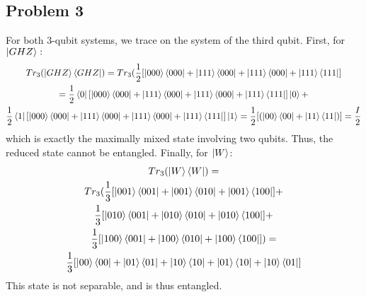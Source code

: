 \documentclass[12pt]{article}%
\begin{document}
 \subsection*{Problem 3}
  For both 3-qubit systems, we trace on the system of the third qubit. First, for $\ket{GHZ}:$
  \begin{gather*}
    Tr_3(\ket{GHZ}\bra{GHZ}) = Tr_3(\frac{1}{2}[\ket{000}\bra{000} + \ket{111}\bra{000} + \ket{111}\bra{000} + \ket{111}\bra{111}] \\
    =  \frac{1}{2} \bra{0}[\ket{000}\bra{000} + \ket{111}\bra{000} + \ket{111}\bra{000} + \ket{111}\bra{111}]\ket{0} + \\ \frac{1}{2}\bra{1}[\ket{000}\bra{000} + \ket{111}\bra{000} + \ket{111}\bra{000} + \ket{111}\bra{111}]\ket{1}
    = \frac{1}{2}[(\ket{00}\bra{00} + \ket{11}\bra{11})] = \frac{I}{2}
  \end{gather*}
  which is exactly the maximally mixed state involving two qubits. Thus, the reduced state cannot be entangled.
  Finally, for $\ket{W}$:
  \begin{gather*}
    Tr_3(\ket{W}\bra{W}) = \\
    Tr_3(\frac{1}{3}[\ket{001}\bra{001} + \ket{001}\bra{010} + \ket{001}\bra{100}] + \\
    \frac{1}{3} [\ket{010}\bra{001} + \ket{010}\bra{010} + \ket{010}\bra{100}] + \\
    \frac{1}{3} [\ket{100}\bra{001} + \ket{100}\bra{010} + \ket{100}\bra{100}]) = \\
    \frac{1}{3}[\ket{00}\bra{00} + \ket{01}\bra{01} + \ket{10}\bra{10}
    + \ket{01}\bra{10} + \ket{10}\bra{01}]
  \end{gather*}
  This state is not separable, and is thus entangled.
\end{document}
